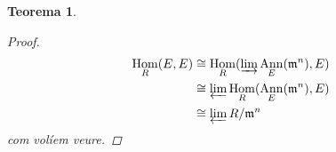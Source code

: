 \documentclass[compress]{article}
\newtheorem{teorema}{Teorema}
\theoremstyle{definition}
\DeclareMathOperator{\Hom}{Hom}
\DeclareMathOperator{\Ann}{Ann}
\begin{document}
\begin{teorema}
\begin{proof}
        \begin{align*}
            \Hom_{R}(E,E)
            &\cong\Hom_{R}(\varinjlim\Ann_{E}(\mathfrak{m}^{n}),E)\\
            &\cong\varprojlim\Hom_{R}(\Ann_{E}(\mathfrak{m}^{n}),E)\\
            &\cong\varprojlim R/\mathfrak{m}^{n}
        \end{align*}
        com volíem veure.
        \end{proof}
\end{teorema}
\printbibliography
\end{document}
